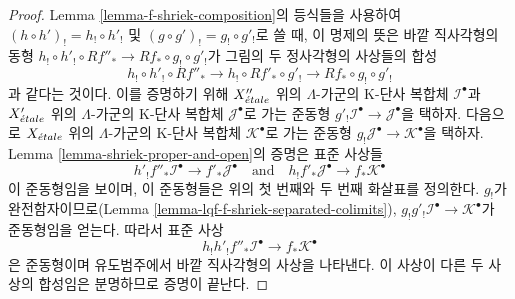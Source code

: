 \begin{proof}
Lemma \ref{lemma-f-shriek-composition}의 등식들을 사용하여
$(h \circ h')_! = h_! \circ h'_!$ 및
$(g \circ g')_! = g_! \circ g'_!$로 쓸 때, 이 명제의 뜻은 바깥
직사각형의 동형
$h_! \circ h'_! \circ Rf''_* \to Rf_* \circ g_! \circ g'_!$가
그림의 두 정사각형의 사상들의 합성
$$
h_! \circ h'_! \circ Rf''_* \to
h_! \circ Rf'_* \circ g'_! \to
Rf_* \circ g_! \circ g'_!
$$
과 같다는 것이다. 이를 증명하기 위해 $X''_{\acute{e}tale}$ 위의
$\Lambda$-가군의 K-단사 복합체 $\mathcal{I}^\bullet$과
$X'_{\acute{e}tale}$ 위의 $\Lambda$-가군의 K-단사 복합체
$\mathcal{J}^\bullet$로 가는 준동형
$g'_!\mathcal{I}^\bullet \to \mathcal{J}^\bullet$을 택하자.
다음으로 $X_{\acute{e}tale}$ 위의 $\Lambda$-가군의 K-단사 복합체
$\mathcal{K}^\bullet$로 가는 준동형
$g_!\mathcal{J}^\bullet \to \mathcal{K}^\bullet$을 택하자.
Lemma \ref{lemma-shriek-proper-and-open}의 증명은 표준 사상들
$$
h'_!f''_*\mathcal{I}^\bullet \to f'_*\mathcal{J}^\bullet
\quad\text{and}\quad
h_!f'_*\mathcal{J}^\bullet \to f_*\mathcal{K}^\bullet
$$
이 준동형임을 보이며, 이 준동형들은 위의 첫 번째와 두 번째 화살표를
정의한다. $g_!$가 완전함자이므로(Lemma
\ref{lemma-lqf-f-shriek-separated-colimits}),
$g_!g'_!\mathcal{I}^\bullet \to \mathcal{K}^\bullet$가 준동형임을
얻는다. 따라서 표준 사상
$$
h_!h'_!f''_*\mathcal{I}^\bullet \to f_*\mathcal{K}^\bullet
$$
은 준동형이며 유도범주에서 바깥 직사각형의 사상을 나타낸다.
이 사상이 다른 두 사상의 합성임은 분명하므로 증명이 끝난다.
\end{proof}

